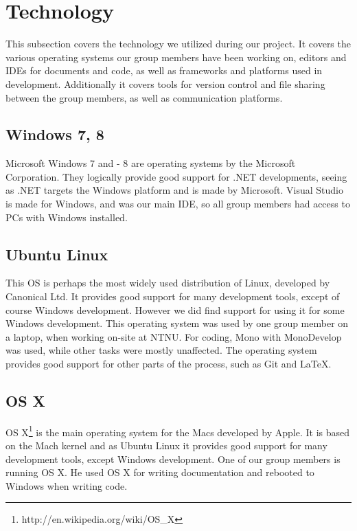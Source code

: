 \section{Technology}%

This subsection covers the technology we utilized during our project. It covers the various operating systems our group members have been working on, editors and IDEs for documents and code, as well as frameworks and platforms used in development. Additionally it covers tools for version control and file sharing between the group members, as well as communication platforms.

\subsection{Windows 7, 8}
Microsoft Windows 7 and - 8 are operating systems by the Microsoft Corporation. They logically provide good support for .NET developments, seeing as .NET targets the Windows platform and is made by Microsoft. Visual Studio is made for Windows, and was our main IDE, so all group members had access to PCs with Windows installed.

\subsection{Ubuntu Linux}
This OS is perhaps the most widely used distribution of Linux, developed by Canonical Ltd. It provides good support for many development tools, except of course Windows development. However we did find support for using it for some Windows development.
This operating system was used by one group member on a laptop, when working on-site at NTNU. For coding, Mono with MonoDevelop was used, while other tasks were mostly unaffected. The operating system provides good support for other parts of the process, such as Git and \LaTeX.

\subsection{OS X}
OS X\footnote{http://en.wikipedia.org/wiki/OS\_X}
 is the main operating system for the Macs developed by Apple. It is based on the Mach kernel and as Ubuntu Linux it provides good support for many development tools, except Windows development. One of our group members is running OS X. He used OS X for writing documentation and rebooted to Windows when writing code. 

